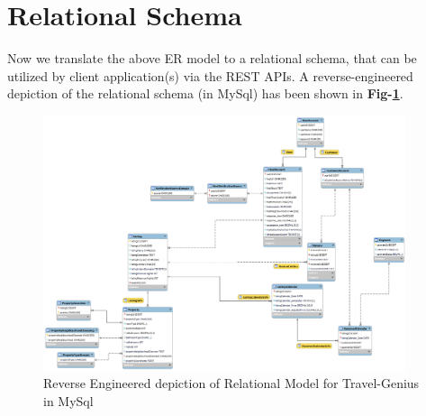 \documentclass[conference]{IEEEtran}
\begin{document}
\vspace{-2mm}

\section{\textbf{Relational Schema}}
    Now we translate the above ER model to a relational schema, that can be utilized by client application(s) via the REST APIs. A reverse-engineered depiction of the relational schema (in MySql) has been shown in \textbf{Fig-\ref{fig_3}}.

   	 \begin{figure}[t]
       		 \centering
		\includegraphics[width=0.95\textwidth]{../Relational_Model/RelationalModel.png}
		\caption{Reverse Engineered depiction of Relational Model for Travel-Genius in MySql} \label{fig_3}
	\end{figure}
\end{document}
